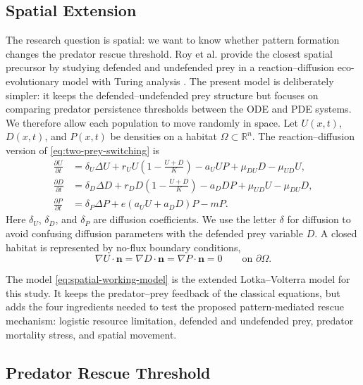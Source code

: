 \documentclass[12pt,letterpaper]{article}
\numberwithin{equation}{section}
\begin{document}
\subsection{Spatial Extension}

The research question is spatial: we want to know whether pattern formation changes
the predator rescue threshold. Roy et al. provide the closest spatial precursor by
studying defended and undefended prey in a reaction--diffusion eco-evolutionary model
with Turing analysis \cite{roy2026}. The present model is deliberately simpler: it
keeps the defended--undefended prey structure but focuses on comparing predator
persistence thresholds between the ODE and PDE systems. We therefore allow each
population to move randomly in space. Let $U(x,t)$, $D(x,t)$, and $P(x,t)$ be densities on a habitat
$\Omega\subset\mathbb{R}^n$. The reaction--diffusion version of
\eqref{eq:two-prey-switching} is
\begin{equation}
\boxed{
\begin{aligned}
    \frac{\partial U}{\partial t}
    &= \delta_U\Delta U
    + r_U U\left(1-\frac{U+D}{K}\right)-a_U U P
    +\mu_{DU}D-\mu_{UD}U,\\
    \frac{\partial D}{\partial t}
    &= \delta_D\Delta D
    + r_D D\left(1-\frac{U+D}{K}\right)-a_D D P
    +\mu_{UD}U-\mu_{DU}D,\\
    \frac{\partial P}{\partial t}
    &= \delta_P\Delta P
    + e(a_U U+a_D D)P-mP.
\end{aligned}}
\label{eq:spatial-working-model}
\end{equation}
Here $\delta_U$, $\delta_D$, and $\delta_P$ are diffusion coefficients. We use the
letter $\delta$ for diffusion to avoid confusing diffusion parameters with the defended
prey variable $D$.
A closed habitat is represented by no-flux boundary conditions,
\begin{equation}
    \nabla U\cdot\mathbf{n}
    =
    \nabla D\cdot\mathbf{n}
    =
    \nabla P\cdot\mathbf{n}
    =0
    \qquad \text{on } \partial\Omega.
\end{equation}

The model \eqref{eq:spatial-working-model} is the extended Lotka--Volterra model for
this study. It keeps the predator--prey feedback of the classical equations, but adds
the four ingredients needed to test the proposed pattern-mediated rescue mechanism:
logistic resource limitation, defended and undefended prey, predator mortality stress,
and spatial movement.

\subsection{Predator Rescue Threshold}
\end{document}
